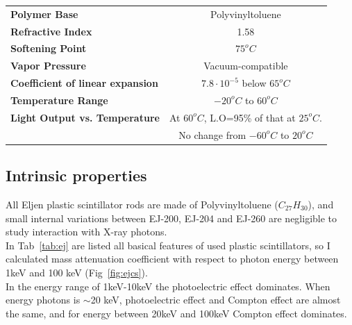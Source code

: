 \documentclass[10pt,a4paper, openany]{book}
\begin{document}
\begin{table}[!h]
\begin{tabular}{lccc}
\textbf{Polymer Base}                                  & \multicolumn{3}{c}{Polyvinyltoluene}                         \\
\textbf{Refractive Index}                              & \multicolumn{3}{c}{1.58}                                     \\
\textbf{Softening Point}                               & \multicolumn{3}{c}{$75^o C$}                                 \\
\textbf{Vapor Pressure}                                & \multicolumn{3}{c}{Vacuum-compatible}                        \\
\textbf{Coefficient of linear expansion}               & \multicolumn{3}{c}{$7.8 \cdot 10^{-5}$ below $65^oC$}        \\
\textbf{Temperature Range}                             & \multicolumn{3}{c}{$-20^oC$ to $60^oC$}                      \\
\textbf{Light Output vs. Temperature}                  & \multicolumn{3}{c}{At $60^oC$, L.O=95\% of that at $25^oC$.} \\
\textbf{}                                              & \multicolumn{3}{c}{No change from $-60^oC$ to $20^oC$} \\ 
\bottomrule    
\end{tabular}
\end{table}

\subsection{Intrinsic properties }

All Eljen plastic scintillator rods are made of Polyvinyltoluene ($C_{27}H_{30}$), and small internal variations between EJ-200, EJ-204 and EJ-260 are negligible to study interaction with X-ray photons.\\
In Tab~\ref{tab:ej} are listed all basical features of used plastic scintillators, so I calculated mass attenuation coefficient with respect to photon energy between 1keV and 100 keV (Fig~\ref{fig:ejcs}).\\
In the energy range of 1keV-10keV the photoelectric effect dominates. When energy photons is $\sim$20 keV, photoelectric effect and Compton effect are almost the same, and for energy between 20keV and 100keV Compton effect dominates.
\end{document}

